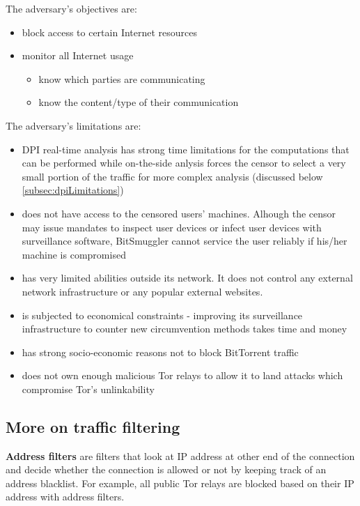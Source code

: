 \documentclass[11pt]{book} %
\newcommand{\projectName}{BitSmuggler }
\begin{document}
The adversary's objectives are:
\begin{itemize}
\item block access to certain Internet resources
\item monitor all Internet usage
\begin{itemize}
\item know which parties are communicating
\item know the content/type of their communication
\end{itemize}
\end{itemize}

The adversary's limitations are:

\begin{itemize}
\item DPI real-time analysis has strong time limitations for the computations that can be performed while on-the-side anlysis forces the censor to select a very small portion of the traffic for more complex analysis (discussed below  \ref{subsec:dpiLimitations}) 
\item does not have access to the censored users' machines. Alhough the censor may issue mandates to inspect user devices or infect user devices with surveillance software, \projectName cannot service the user reliably if his/her machine is compromised
\item has very limited abilities outside its network. It does not control any external network infrastructure or any popular external websites.
\item is subjected to economical constraints - improving its surveillance infrastructure to counter new circumvention methods takes time and money
\item has strong socio-economic reasons not to block BitTorrent traffic
\item does not own enough malicious Tor relays to allow it to land attacks which compromise Tor's unlinkability
\end{itemize}

\subsection{More on traffic filtering}
\label{subsec:trafficFiltering}

\textbf{Address filters} are filters that look at IP address at other end of the connection and decide whether the connection is allowed or not by keeping track of an address blacklist. For example, all public Tor relays are blocked based on their IP address with address filters.
\end{document}
